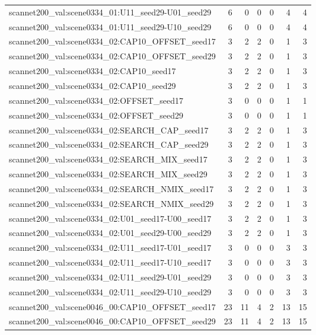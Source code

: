 \begin{table}[t]
\begin{tabular}{lrrrrrr}
scannet200\_val:scene0334\_01:U11\_seed29-U01\_seed29 & 6 & 0 & 0 & 0 & 4 & 4 \\
scannet200\_val:scene0334\_01:U11\_seed29-U10\_seed29 & 6 & 0 & 0 & 0 & 4 & 4 \\
scannet200\_val:scene0334\_02:CAP10\_OFFSET\_seed17 & 3 & 2 & 2 & 0 & 1 & 3 \\
scannet200\_val:scene0334\_02:CAP10\_OFFSET\_seed29 & 3 & 2 & 2 & 0 & 1 & 3 \\
scannet200\_val:scene0334\_02:CAP10\_seed17 & 3 & 2 & 2 & 0 & 1 & 3 \\
scannet200\_val:scene0334\_02:CAP10\_seed29 & 3 & 2 & 2 & 0 & 1 & 3 \\
scannet200\_val:scene0334\_02:OFFSET\_seed17 & 3 & 0 & 0 & 0 & 1 & 1 \\
scannet200\_val:scene0334\_02:OFFSET\_seed29 & 3 & 0 & 0 & 0 & 1 & 1 \\
scannet200\_val:scene0334\_02:SEARCH\_CAP\_seed17 & 3 & 2 & 2 & 0 & 1 & 3 \\
scannet200\_val:scene0334\_02:SEARCH\_CAP\_seed29 & 3 & 2 & 2 & 0 & 1 & 3 \\
scannet200\_val:scene0334\_02:SEARCH\_MIX\_seed17 & 3 & 2 & 2 & 0 & 1 & 3 \\
scannet200\_val:scene0334\_02:SEARCH\_MIX\_seed29 & 3 & 2 & 2 & 0 & 1 & 3 \\
scannet200\_val:scene0334\_02:SEARCH\_NMIX\_seed17 & 3 & 2 & 2 & 0 & 1 & 3 \\
scannet200\_val:scene0334\_02:SEARCH\_NMIX\_seed29 & 3 & 2 & 2 & 0 & 1 & 3 \\
scannet200\_val:scene0334\_02:U01\_seed17-U00\_seed17 & 3 & 2 & 2 & 0 & 1 & 3 \\
scannet200\_val:scene0334\_02:U01\_seed29-U00\_seed29 & 3 & 2 & 2 & 0 & 1 & 3 \\
scannet200\_val:scene0334\_02:U11\_seed17-U01\_seed17 & 3 & 0 & 0 & 0 & 3 & 3 \\
scannet200\_val:scene0334\_02:U11\_seed17-U10\_seed17 & 3 & 0 & 0 & 0 & 3 & 3 \\
scannet200\_val:scene0334\_02:U11\_seed29-U01\_seed29 & 3 & 0 & 0 & 0 & 3 & 3 \\
scannet200\_val:scene0334\_02:U11\_seed29-U10\_seed29 & 3 & 0 & 0 & 0 & 3 & 3 \\
scannet200\_val:scene0046\_00:CAP10\_OFFSET\_seed17 & 23 & 11 & 4 & 2 & 13 & 15 \\
scannet200\_val:scene0046\_00:CAP10\_OFFSET\_seed29 & 23 & 11 & 4 & 2 & 13 & 15 \\

\end{tabular}
\end{table}
